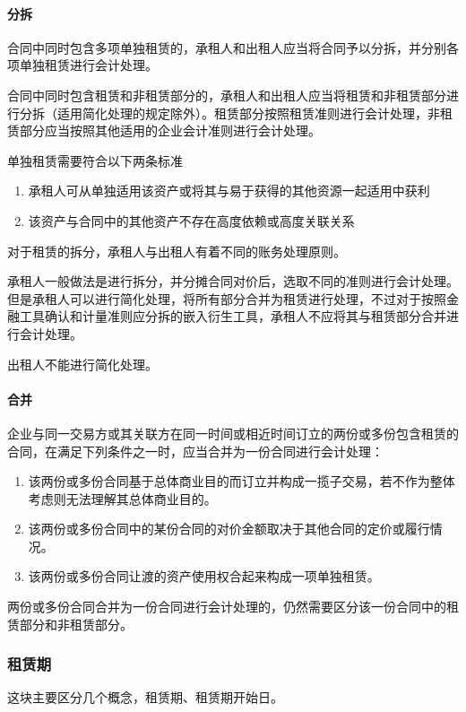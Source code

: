 \documentclass[UTF8,12pt]{ctexart}
\numberwithin{equation}{section} %
\numberwithin{figure}{section}
\numberwithin{table}{section}
\begin{document}
	\paragraph{分拆}
	合同中同时包含多项单独租赁的，承租人和出租人应当将合同予以分拆，并分别各项单独租赁进行会计处理。
	
	合同中同时包含租赁和非租赁部分的，承租人和出租人应当将租赁和非租赁部分进行分拆（适用简化处理的规定除外）。租赁部分按照租赁准则进行会计处理，非租赁部分应当按照其他适用的企业会计准则进行会计处理。
	
	单独租赁需要符合以下两条标准
	\begin{enumerate}
		\item 承租人可从单独适用该资产或将其与易于获得的其他资源一起适用中获利
		
		\item 该资产与合同中的其他资产不存在高度依赖或高度关联关系
	\end{enumerate}
	
	对于租赁的拆分，承租人与出租人有着不同的账务处理原则。
	
	承租人一般做法是进行拆分，并分摊合同对价后，选取不同的准则进行会计处理。但是承租人可以进行简化处理，将所有部分合并为租赁进行处理，不过对于按照金融工具确认和计量准则应分拆的嵌入衍生工具，承租人不应将其与租赁部分合并进行会计处理。
	
	出租人不能进行简化处理。
	
	
	\paragraph{合并}
	
	企业与同一交易方或其关联方在同一时间或相近时间订立的两份或多份包含租赁的合同，在满足下列条件之一时，应当合并为一份合同进行会计处理：
	\begin{enumerate}
		\item 该两份或多份合同基于总体商业目的而订立并构成一揽子交易，若不作为整体考虑则无法理解其总体商业目的。
		\item 该两份或多份合同中的某份合同的对价金额取决于其他合同的定价或履行情况。
		\item 该两份或多份合同让渡的资产使用权合起来构成一项单独租赁。
	\end{enumerate}	
	两份或多份合同合并为一份合同进行会计处理的，仍然需要区分该一份合同中的租赁部分和非租赁部分。
	

	\subsubsection{租赁期}
	这块主要区分几个概念，租赁期、租赁期开始日。
	
\end{document}
